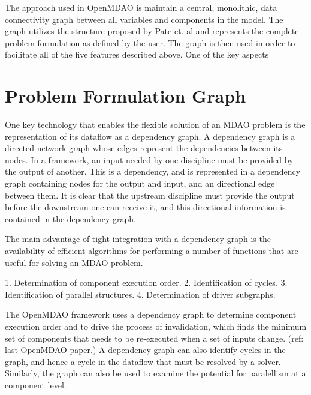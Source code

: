 \documentclass[]{aiaa-tc} %
\begin{document}
    The approach used in OpenMDAO is maintain a central, monolithic, data connectivity graph between all 
    variables and components in the model. The graph utilizes the structure proposed by Pate et. al \cite{graph_problem2013} 
    and represents the complete problem formulation as defined by the user. The graph is then used in order to 
    facilitate all of the five features described above. One of the key aspects 

  \section{Problem Formulation Graph}

    One key technology that enables the flexible solution of an MDAO problem is the representation
    of its dataflow as a dependency graph. A dependency graph is a directed network graph whose
    edges represent the dependencies between its nodes. In a framework, an input needed by one
    discipline must be provided by the output of another. This is a dependency, and is represented 
    in a dependency graph containing nodes for the output and input, and an directional edge
    between them. It is clear that the upstream discipline must provide the output before the 
    downstream one can receive it, and this directional information is contained in the dependency
    graph.

    The main advantage of tight integration with a dependency graph is the availability of efficient
    algorithms for performing a number of functions that are useful for solving an MDAO problem.

      1. Determination of component execution order.
      2. Identification of cycles.
      3. Identification of parallel structures.
      4. Determination of driver subgraphs.
      
    The OpenMDAO framework uses a dependency graph to determine component execution order and to
    drive the process of invalidation, which finds the minimum set of components that needs to
    be re-executed when a set of inputs change. (ref: last OpenMDAO paper.) A dependency graph
    can also identify cycles in the graph, and hence a cycle in the dataflow that must be resolved
    by a solver. Similarly, the graph can also be used to examine the potential for paralellism at
    a component level.
\end{document}

